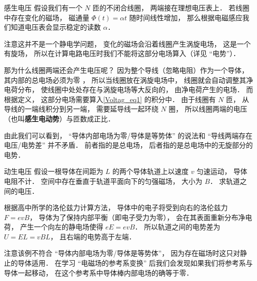 \begin{example}{感生电压}
假设我们有一个 $N$ 匝的不闭合线圈， 两端接在理想电压表上． 若线圈中存在变化的磁场， 磁通量 $\Phi(t) = \alpha t$ 随时间线性增加， 那么根据电磁感应我们知道电压表会显示稳定的读数 $\alpha$．

注意这并不是一个静电学问题， 变化的磁场会沿着线圈产生涡旋电场， 这是一个有旋场， 所以在计算电路电压时我们不能将这部分电场算入（详见 “电势”）．

那为什么线圈两端还会产生电压呢？ 因为整个导线（忽略电阻）作为一个导体， 其内部的总电场必须为零%
， 所以当线圈放在涡旋电场中， 线圈就会自动调整其净电荷分布， 使线圈中处处存在与涡旋电场等大反向的， 由净电荷产生的电场． 而根据定义， 这部分电场需要算入\autoref{Voltag_eq1} 的积分中． 由于线圈有 $N$ 匝， 从导线的一端线积分到另一端， 需要延导线一起环绕 $N$ 圈， 所以线圈两端的电压（也叫\textbf{感生电动势}）与匝数成正比．
\end{example}

由此我们可以看到， “导体内部电场为零/导体是等势体” 的说法和 “导线两端存在电压/电势差” 并不矛盾． 前者指的是总电场， 后者指的是总电场中的无旋部分的电势．

\begin{example}{动生电压}
假设一根导体在间距为 $L$ 的两个导体轨道上以速度 $v$ 匀速运动， 导体电阻不计． 空间中存在垂直于轨道平面向下的匀强磁场， 大小为 $B$． 求轨道之间的电压．

根据高中所学的洛伦兹力计算方法， 导体中的电子将受到向右的洛伦兹力 $F = evB$， 导体为了保持内部平衡（即电子受力为零）， 会在其表面重新分布净电荷， 产生一个向左的静电场使得 $eE = evB$． 所以轨道之间的电势差为 $U = EL = vBL$， 且右端的电势高于左端．
\end{example}

注意该例不符合 “导体内部电场为零/导体是等势体”， 因为存在磁场时这只对静止的导体适用． 在学习 “电磁场的参考系变换” 后我们会发现如果我们将参考系与导体一起移动， 在这个参考系中导体棒内部电场的确等于零．
